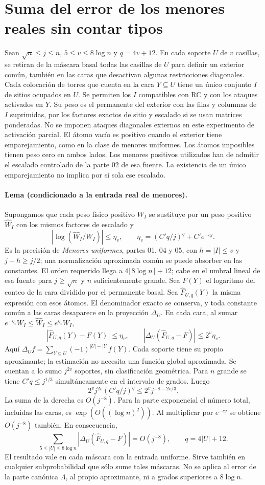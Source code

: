 \section{Suma del error de los menores reales sin contar tipos}
Sean $\sqrt n\le j\le n$, $5\le v\le8\log n$ y $q=4v+12$. En cada soporte $U$
de $v$ casillas, se retiran de la máscara basal todas las casillas de $U$ para definir
un exterior común, también en las caras que desactivan algunas restricciones diagonales.
Cada colocación de torres que cuenta en la cara $Y\subseteq U$ tiene un único conjunto
$I$ de sitios ocupados en $U$. Se permiten los $I$ compatibles con RC y con los ataques
activados en $Y$. Su peso es el permanente del exterior con las filas y columnas de $I$
suprimidas, por los factores exactos de sitio y escalado si se usan matrices ponderadas.
No se imponen ataques diagonales externos en este experimento de activación parcial.
El átomo vacío es positivo cuando el exterior tiene emparejamiento, como en la
clase de menores uniformes. Los átomos imposibles tienen peso cero en ambos lados.
Los menores positivos utilizados han de admitir el escalado controlado de la parte 02
de esa fuente. La existencia de un único emparejamiento no implica por sí sola ese escalado.

\paragraph{Lema (condicionado a la entrada real de menores).}
Supongamos que cada peso físico positivo $W_I$ se sustituye por un peso positivo
$\widehat W_I$ con los mismos factores de escalado y
\[
 |\log(\widehat W_I/W_I)|\le \eta_v,\qquad
 \eta_v=(C'q/j)^q+C'e^{-cj}.
\]
Es la precisión de \emph{Menores uniformes}, partes 01, 04 y 05, con $h=|I|\le v$
y $j-h\ge j/2$; una normalización aproximada común se puede absorber en las constantes.
El orden requerido llega a $4\lfloor8\log n\rfloor+12$; cabe en el umbral lineal
de esa fuente para $j\ge\sqrt n$ y $n$ suficientemente grande.
Sea $F(Y)$ el logaritmo del conteo de la cara dividido por el permanente basal.
Sea $\widehat F_{U,q}(Y)$ la misma expresión con esos átomos. El denominador exacto
se conserva, y toda constante común a las caras desaparece en la proyección $\Delta_U$.
En cada cara, al sumar $e^{-\eta_v}W_I\le\widehat W_I\le e^{\eta_v}W_I$,
\[
 |\widehat F_{U,q}(Y)-F(Y)|\le\eta_v,\qquad
 |\Delta_U(\widehat F_{U,q}-F)|\le 2^v\eta_v .
\]
Aquí $\Delta_U f=\sum_{Y\subseteq U}(-1)^{|U|-|Y|}f(Y)$. Cada soporte tiene
su propio aproximante; la estimación no necesita una función global aproximada.
Se cuentan a lo sumo $j^{2v}$ soportes, sin clasificación geométrica. Para $n$ grande
se tiene $C'q\le j^{1/3}$ simultáneamente en el intervalo de grados. Luego
\[
 2^v j^{2v}(C'q/j)^q\le 2^v j^{-8-2v/3}.
\]
La suma de la derecha es $O(j^{-8})$. Para la parte exponencial el número total,
incluidas las caras, es $\exp(O((\log n)^2))$. Al multiplicar por $e^{-cj}$ se
obtiene $O(j^{-8})$ también. En consecuencia,
\[
 \sum_{5\le |U|\le8\log n}|\Delta_U(\widehat F_{U,q}-F)|=O(j^{-8}),
 \qquad q=4|U|+12 .
\]
El resultado vale en cada máscara con la entrada uniforme. Sirve también en cualquier
subprobabilidad que sólo sume tales máscaras. No se aplica al error de la parte
canónica $\Lambda$, al propio aproximante, ni a grados superiores a $8\log n$.
